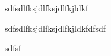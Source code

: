 \documentclass[14pt]{extreport}
\begin{document}
sdfsdlfksjdlfksjdlfkjldkf

sdfsdlfksjdlfksjdlfkjldkfdfsdf

sdfsf
\end{document}
